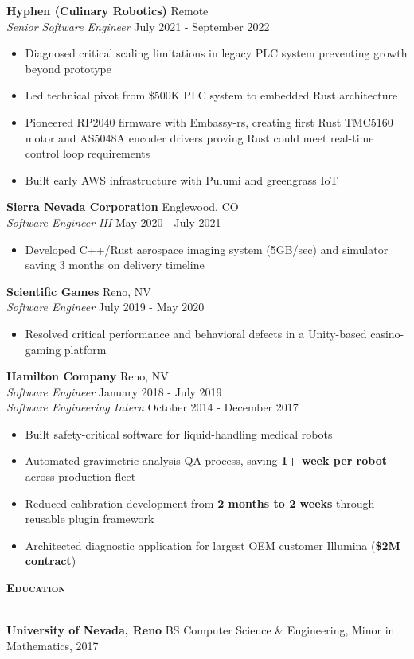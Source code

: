 \documentclass[a4paper]{article}
\newcommand{\lineunder} {
    \vspace*{-8pt} \\
    \hspace*{-18pt} \hrulefill \\
}
\newcommand{\header} [1] {
    {\hspace*{-18pt}\vspace*{6pt} \large \textbf{\textsc{#1}}}
    \vspace*{-6pt} \lineunder
    \vspace*{4pt}
}
\begin{document}
\textbf{Hyphen (Culinary Robotics)} \hfill Remote\\
\textit{Senior Software Engineer} \hfill July 2021 - September 2022\\
\vspace{-1mm}
\begin{itemize} \itemsep 1pt
    \item Diagnosed critical scaling limitations in legacy PLC system preventing growth beyond prototype
    \item Led technical pivot from \$500K PLC system to embedded Rust architecture
    \item Pioneered RP2040 firmware with Embassy-rs, creating first Rust TMC5160 motor and AS5048A encoder drivers proving Rust could meet real-time control loop requirements
    \item Built early AWS infrastructure with Pulumi and greengrass IoT
\end{itemize}

\textbf{Sierra Nevada Corporation} \hfill Englewood, CO\\
\textit{Software Engineer III} \hfill May 2020 - July 2021\\
\vspace{-1mm}
\begin{itemize} \itemsep 1pt
    \item Developed C++/Rust aerospace imaging system (5GB/sec) and simulator saving 3 months on delivery timeline
\end{itemize}

\textbf{Scientific Games} \hfill Reno, NV\\
\textit{Software Engineer} \hfill July 2019 - May 2020\\
\vspace{-1mm}
\begin{itemize} \itemsep 1pt
    \item Resolved critical performance and behavioral defects in a Unity-based casino-gaming platform
\end{itemize}

\textbf{Hamilton Company} \hfill Reno, NV\\
\textit{Software Engineer} \hfill January 2018 - July 2019\\
\textit{Software Engineering Intern} \hfill October 2014 - December 2017\\
\vspace{-1mm}
\begin{itemize} \itemsep 1pt
    \item Built safety-critical software for liquid-handling medical robots
    \item Automated gravimetric analysis QA process, saving \textbf{1+ week per robot} across production fleet
    \item Reduced calibration development from \textbf{2 months to 2 weeks} through reusable plugin framework
    \item Architected diagnostic application for largest OEM customer Illumina (\textbf{\$2M contract})
\end{itemize}

\header{Education}
\textbf{University of Nevada, Reno} \hfill BS Computer Science \& Engineering, Minor in Mathematics, 2017
\end{document}
